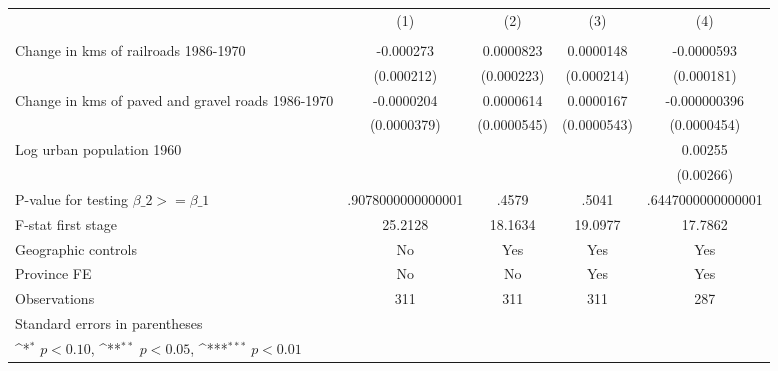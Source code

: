 {
\def\sym#1{\ifmmode^{#1}\else\(^{#1}\)\fi}
\begin{tabular}{l*{4}{c}}
\hline\hline
                &\multicolumn{1}{c}{(1)}&\multicolumn{1}{c}{(2)}&\multicolumn{1}{c}{(3)}&\multicolumn{1}{c}{(4)}\\
                &\multicolumn{1}{c}{}&\multicolumn{1}{c}{}&\multicolumn{1}{c}{}&\multicolumn{1}{c}{}\\
\hline
Change in kms of railroads 1986-1970&-0.000273         &0.0000823         &0.0000148         &-0.0000593         \\
                &(0.000212)         &(0.000223)         &(0.000214)         &(0.000181)         \\
[1em]
Change in kms of paved and gravel roads 1986-1970&-0.0000204         &0.0000614         &0.0000167         &-0.000000396         \\
                &(0.0000379)         &(0.0000545)         &(0.0000543)         &(0.0000454)         \\
[1em]
Log urban population 1960&                  &                  &                  &  0.00255         \\
                &                  &                  &                  &(0.00266)         \\
\hline
P-value for testing $\beta\_{2} >= \beta\_{1}$&.9078000000000001         &    .4579         &    .5041         &.6447000000000001         \\
F-stat first stage&  25.2128         &  18.1634         &  19.0977         &  17.7862         \\
Geographic controls&       No         &      Yes         &      Yes         &      Yes         \\
Province FE     &       No         &       No         &      Yes         &      Yes         \\
Observations    &      311         &      311         &      311         &      287         \\
\hline\hline
\multicolumn{5}{l}{\footnotesize Standard errors in parentheses}\\
\multicolumn{5}{l}{\footnotesize \sym{*} \(p<0.10\), \sym{**} \(p<0.05\), \sym{***} \(p<0.01\)}\\
\end{tabular}
}
